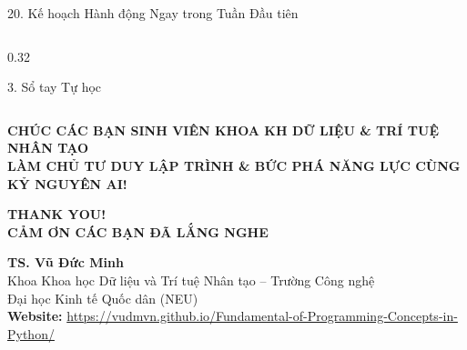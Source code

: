 \documentclass[aspectratio=169, 10pt]{beamer}
\begin{document}
\begin{frame}{20. Kế hoạch Hành động Ngay trong Tuần Đầu tiên}
\begin{columns}[T]
\begin{column}{0.32\textwidth}
\begin{cbox}[accentorange]{3. Sổ tay Tự học}
      \end{cbox}
    \end{column}
  \end{columns}
  \vspace{0.2cm}
  \begin{tcolorbox}[colback=primaryblue!5, colframe=primaryblue, arc=3pt, left=8pt, right=8pt, top=6pt, bottom=6pt]
    \centering\small
    \textbf{\textcolor{primaryblue}{CHÚC CÁC BẠN SINH VIÊN KHOA KH DỮ LIỆU \& TRÍ TUỆ NHÂN TẠO}}\\[3pt]
    \textbf{\textcolor{secondarygreen}{LÀM CHỦ TƯ DUY LẬP TRÌNH \& BỨC PHÁ NĂNG LỰC CÙNG KỶ NGUYÊN AI!}}
  \end{tcolorbox}
\end{frame}

\begin{frame}[plain]
  \vfill
  \centering
  {\Huge\textbf{\textcolor{primaryblue}{THANK YOU!}}}\\[8pt]
  {\Large\textbf{\textcolor{secondarygreen}{CẢM ƠN CÁC BẠN ĐÃ LẮNG NGHE}}}\\[15pt]

  \begin{tcolorbox}[colback=white, colframe=primaryblue, arc=4pt, width=0.82\textwidth, left=10pt, right=10pt, top=8pt, bottom=8pt]
    \centering\footnotesize
    \textbf{\normalsize TS. Vũ Đức Minh}\\[3pt]
    Khoa Khoa học Dữ liệu và Trí tuệ Nhân tạo -- Trường Công nghệ\\
     Đại học Kinh tế Quốc dân (NEU)\\[6pt]
   
    \textbf{Website:} \url{https://vudmvn.github.io/Fundamental-of-Programming-Concepts-in-Python/}
  \end{tcolorbox}
  \vfill
\end{frame}
\end{document}
